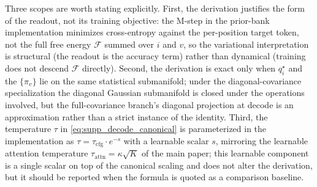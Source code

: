 \documentclass[twoside,11pt]{article}
\begin{document}
Three scopes are worth stating explicitly. First, the derivation justifies the form of the readout, not its training objective: the M-step in the prior-bank implementation minimizes cross-entropy against the per-position target token, not the full free energy $\mathcal{F}$ summed over $i$ and $v$, so the variational interpretation is structural (the readout is the accuracy term) rather than dynamical (training does not descend $\mathcal{F}$ directly). Second, the derivation is exact only when $q_i^{\star}$ and the $\{\pi_v\}$ lie on the same statistical submanifold; under the diagonal-covariance specialization the diagonal Gaussian submanifold is closed under the operations involved, but the full-covariance branch's diagonal projection at decode is an approximation rather than a strict instance of the identity. Third, the temperature $\tau$ in \eqref{eq:supp_decode_canonical} is parameterized in the implementation as $\tau = \tau_{\mathrm{cfg}} \cdot e^{-s}$ with a learnable scalar $s$, mirroring the learnable attention temperature $\tau_{\mathrm{attn}} = \kappa\sqrt{K}$ of the main paper; this learnable component is a single scalar on top of the canonical scaling and does not alter the derivation, but it should be reported when the formula is quoted as a comparison baseline.



\end{document}

